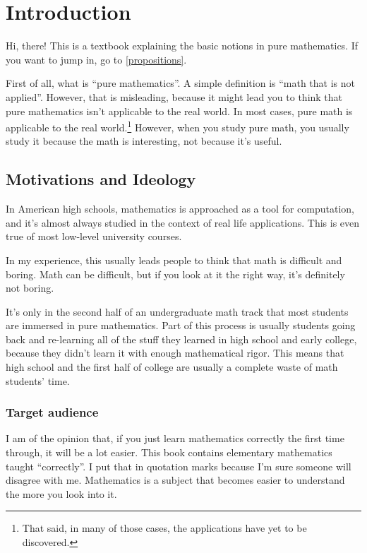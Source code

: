 \chapter{Introduction}

Hi, there! This is a textbook explaining the basic notions in pure
mathematics. If you want to jump in, go to \cref{propositions}.

First of all, what is ``pure mathematics''. A simple definition is
``math that is not applied''. However, that is misleading, because it
might lead you to think that pure mathematics isn't applicable to the
real world. In most cases, pure math is applicable to the real
world.\footnote{That said, in many of those cases, the applications
  have yet to be discovered.} However, when you study pure math, you
usually study it because the math is interesting, not because it's
useful.

\section{Motivations and Ideology}

In American high schools, mathematics is approached as a tool for
computation, and it's almost always studied in the context of real
life applications. This is even true of most low-level university
courses.

In my experience, this usually leads people to think that math is
difficult and boring. Math can be difficult, but if you look at it the
right way, it's definitely not boring.

It's only in the second half of an undergraduate math track that most
students are immersed in pure mathematics. Part of this process is
usually students going back and re-learning all of the stuff they
learned in high school and early college, because they didn't learn it
with enough mathematical rigor. This means that high school and the
first half of college are usually a complete waste of math students'
time.

\subsection{Target audience}

I am of the opinion that, if you just learn mathematics correctly the
first time through, it will be a lot easier. This book contains
elementary mathematics taught ``correctly''. I put that in quotation
marks because I'm sure someone will disagree with me. Mathematics is a
subject that becomes easier to understand the more you look into it.

